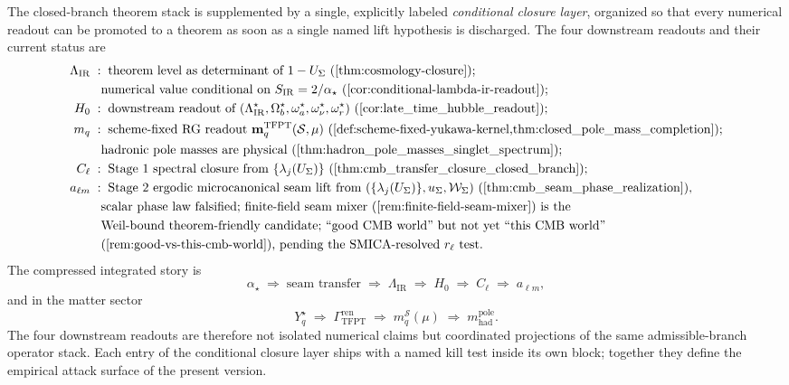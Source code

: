 \documentclass[11pt,a4paper]{article}
\theoremstyle{definition}
\theoremstyle{remark}
\begin{document}
The closed-branch theorem stack is supplemented by a single, explicitly labeled
\emph{conditional closure layer}, organized so that every numerical readout can be promoted to a
theorem as soon as a single named lift hypothesis is discharged. The four downstream readouts and
their current status are
\[
\begin{aligned}
\Lambda_{\mathrm{IR}}
\;&:\;\text{theorem level as determinant of $1-U_\Sigma$
(\Cref{thm:cosmology-closure})};\\
&\phantom{:}\;\text{numerical value conditional on $S_{\mathrm{IR}}=2/\alpha_\star$
(\Cref{cor:conditional-lambda-ir-readout})};\\
H_0
\;&:\;\text{downstream readout of $(\Lambda_{\mathrm{IR}}^\star,\Omega_b^\star,\omega_a^\star,
\omega_\nu^\star,\omega_r^\star)$ (\Cref{cor:late_time_hubble_readout})};\\
m_q
\;&:\;\text{scheme-fixed RG readout
$\mathbf m_q^{\mathrm{TFPT}}(\mathcal S,\mu)$
(\Cref{def:scheme-fixed-yukawa-kernel,thm:closed_pole_mass_completion})};\\
&\phantom{:}\;\text{hadronic pole masses are physical
(\Cref{thm:hadron_pole_masses_singlet_spectrum})};\\
C_\ell
\;&:\;\text{Stage 1 spectral closure from $\{\lambda_j(U_\Sigma)\}$
(\Cref{thm:cmb_transfer_closure_closed_branch})};\\
a_{\ell m}
\;&:\;\text{Stage 2 ergodic microcanonical seam lift from
$(\{\lambda_j(U_\Sigma)\},u_\Sigma,\mathcal W_\Sigma)$
(\Cref{thm:cmb_seam_phase_realization})},\\
&\phantom{:}\;\text{scalar phase law falsified; finite-field seam mixer
(\Cref{rem:finite-field-seam-mixer}) is the}\\
&\phantom{:}\;\text{Weil-bound theorem-friendly candidate;
``good CMB world'' but not yet ``this CMB world''}\\
&\phantom{:}\;\text{(\Cref{rem:good-vs-this-cmb-world}), pending the
SMICA-resolved $r_\ell$ test.}
\end{aligned}
\]
The compressed integrated story is
\[
\alpha_\star
\;\Rightarrow\;
\text{seam transfer}
\;\Rightarrow\;
\Lambda_{\mathrm{IR}}
\;\Rightarrow\;
H_0
\;\Rightarrow\;
C_\ell
\;\Rightarrow\;
a_{\ell m},
\]
and in the matter sector
\[
Y_q^\star
\;\Rightarrow\;
\Gamma_{\mathrm{TFPT}}^{\mathrm{ren}}
\;\Rightarrow\;
m_q^{\mathcal S}(\mu)
\;\Rightarrow\;
m_{\mathrm{had}}^{\mathrm{pole}}.
\]
The four downstream readouts are therefore not isolated numerical claims but coordinated projections
of the same admissible-branch operator stack. Each entry of the conditional closure layer ships with
a named kill test inside its own block; together they define the empirical attack surface of the
present version.
\end{document}
